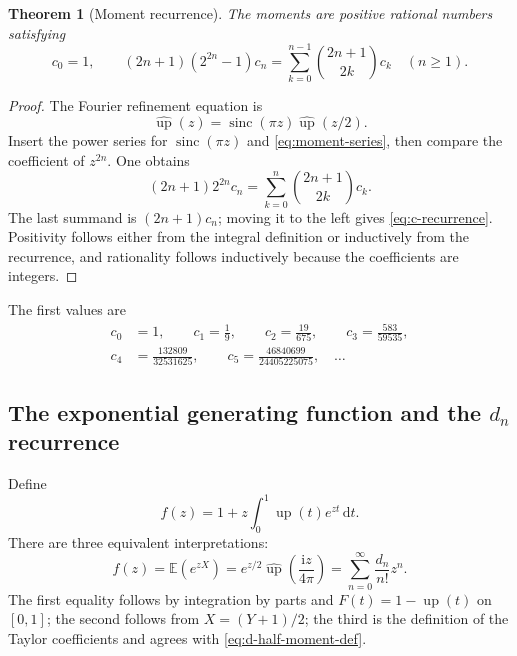 \documentclass[11pt,oneside]{article}
\newtheorem{theorem}{Theorem}[section]
\theoremstyle{definition}
\theoremstyle{remark}
\newcommand{\upf}{\operatorname{up}}
\newcommand{\sinc}{\operatorname{sinc}}
\newcommand{\dd}{\,\mathrm d}
\newcommand{\ii}{\mathrm i}
\newcommand{\E}{\mathbb E}
\newcommand{\Fourier}{\widehat{\upf}}
\begin{document}
\begin{theorem}[Moment recurrence]\label{thm:c-recurrence}
The moments are positive rational numbers satisfying
\begin{equation}\label{eq:c-recurrence}
  c_0=1,
  \qquad
  (2n+1)(2^{2n}-1)c_n
  =\sum_{k=0}^{n-1}\binom{2n+1}{2k}c_k
  \quad(n\ge1).
\end{equation}
\end{theorem}

\begin{proof}
The Fourier refinement equation is
\begin{equation}\label{eq:Fourier-refinement}
  \Fourier(z)=\sinc(\pi z)\Fourier(z/2).
\end{equation}
Insert the power series for $\sinc(\pi z)$ and
\eqref{eq:moment-series}, then compare the coefficient of $z^{2n}$.  One obtains
\begin{equation}\label{eq:c-pre-recurrence}
  (2n+1)2^{2n}c_n=
  \sum_{k=0}^{n}\binom{2n+1}{2k}c_k.
\end{equation}
The last summand is $(2n+1)c_n$; moving it to the left gives
\eqref{eq:c-recurrence}.  Positivity follows either from the integral definition or
inductively from the recurrence, and rationality follows inductively because the
coefficients are integers.
\end{proof}

The first values are
\begin{equation}\label{eq:first-c-values}
\begin{split}
 c_0&=1,\qquad c_1=\frac19,\qquad c_2=\frac{19}{675},
 \qquad c_3=\frac{583}{59535},\\
 c_4&=\frac{132809}{32531625},\qquad
 c_5=\frac{46840699}{24405225075},\quad\ldots
\end{split}
\end{equation}

\subsection{The exponential generating function and the \texorpdfstring{$d_n$}{d n} recurrence}

Define
\begin{equation}\label{eq:f-generating}
  f(z)=1+z\int_0^1\upf(t)e^{zt}\dd t.
\end{equation}
There are three equivalent interpretations:
\begin{equation}\label{eq:f-three-forms}
  f(z)=\E(e^{zX})
  =e^{z/2}\Fourier\left(\frac{\ii z}{4\pi}\right)
  =\sum_{n=0}^{\infty}\frac{d_n}{n!}z^n.
\end{equation}
The first equality follows by integration by parts and
$F(t)=1-\upf(t)$ on $[0,1]$; the second follows from $X=(Y+1)/2$; the third is the
definition of the Taylor coefficients and agrees with
\eqref{eq:d-half-moment-def}.
\end{document}
